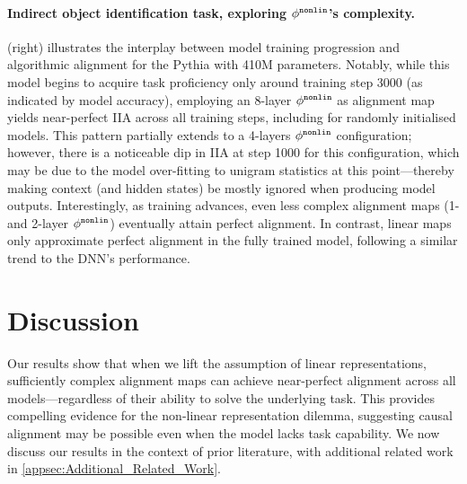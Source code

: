 \documentclass{article}
\begin{document}
\vspace{-1pt}
\paragraph{Indirect object identification task, exploring $\phi^{\mathtt{nonlin}}$'s complexity.}
 (right) illustrates the interplay between model training progression and algorithmic alignment for the Pythia with 410M parameters.
Notably, while this model begins to acquire task proficiency only around training step 3000 (as indicated by model accuracy), employing an 8-layer $\phi^{\mathtt{nonlin}}$ as alignment map yields near-perfect IIA across all training steps, including for randomly initialised models. 
This pattern partially extends to a 4-layers $\phi^{\mathtt{nonlin}}$ configuration; however, there is a noticeable dip in IIA at step 1000 for this configuration, which may be due to the model over-fitting to unigram statistics \citep{changbergen2022word,belrose2024neural} at this point---thereby making context (and hidden states) be mostly ignored when producing model outputs.
Interestingly, as training advances, even less complex alignment maps (1- and 2-layer $\phi^{\mathtt{nonlin}}$) eventually attain perfect alignment. 
In contrast, linear maps only approximate perfect alignment in the fully trained model, following a similar trend to the DNN's performance.

\section{Discussion}

Our results show that when we lift the assumption of linear representations, sufficiently complex alignment maps can achieve near-perfect alignment across all models---regardless of their ability to solve the underlying task.
This provides compelling evidence for the non-linear representation dilemma, suggesting causal alignment may be possible even when the model lacks task capability.
We now discuss our results in the context of prior literature, with additional related work in \cref{appsec:Additional_Related_Work}.

\vspace{-2pt}
\end{document}
